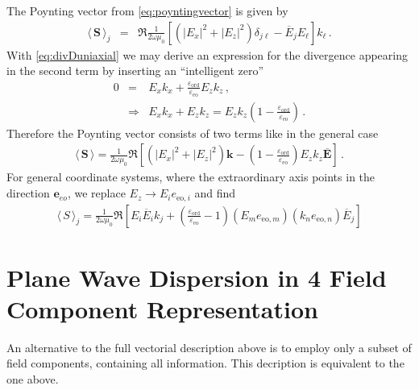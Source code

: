 \documentclass[12pt,a4paper,twoside,openright,BCOR10mm,headsepline,titlepage,abstracton,chapterprefix,final]{scrreprt}
\newcommand\Vector[1]{{\mathbf{#1}}}
\newcommand\vacuum{0}
\newcommand\wavenumber{k}
\newcommand\Wavevector{\Vector{\wavenumber}}
\newcommand\scalarEfield{E}
\newcommand\Efield{\Vector{\scalarEfield}}
\newcommand\vacuumpermeability{\scalarpermeability_{\vacuum}}
\newcommand\scalarpermeability{\mu}
\newcommand\scalarpermittivity{\varepsilon}
\newcommand\ordi{\text{ord}}
\newcommand\eo{\text{eo}}
\newcommand{\timeavg}[1]{{\langle\,#1\,\rangle}}
\begin{document}
The Poynting vector from \eqref{eq:poyntingvector} is given by
\begin{eqnarray}
 \timeavg{\Vector{S}}_j &=&  \Re\frac{1}{2 \omega \vacuumpermeability}\left[ (|\scalarEfield_x|^2 + |\scalarEfield_z|^2) \delta_{j\ell}  - \overline{\scalarEfield}_j \scalarEfield_\ell \right] k_\ell\,.
\end{eqnarray}
With \eqref{eq:divDuniaxial} we may derive an expression for the divergence appearing in the second term by inserting an ``intelligent zero''
\begin{eqnarray}
 0 &=& \scalarEfield_x \wavenumber_x + \frac{\scalarpermittivity_{\ordi}}{\scalarpermittivity_\eo} \scalarEfield_z \wavenumber_z\,,\nonumber\\
&\Rightarrow& \scalarEfield_x \wavenumber_x + \scalarEfield_z \wavenumber_z = \scalarEfield_z \wavenumber_z \left(1 - \frac{\scalarpermittivity_{\ordi}}{\scalarpermittivity_\eo}\right)\,. \label{eq:divEviolation}
\end{eqnarray}
Therefore the Poynting vector consists of two terms like in the general case
\begin{eqnarray}
  \timeavg{\Vector{S}} = \frac{ 1 }{ 2\omega\vacuumpermeability } \Re 
  \left[
      (|\scalarEfield_x|^2 + |\scalarEfield_z|^2)\Wavevector
      - \left(1 - \frac{\scalarpermittivity_{\ordi}}{\scalarpermittivity_\eo}\right)\scalarEfield_z \wavenumber_z \overline{\Efield}
  \right]\,.\label{eq:Suniaxialeo}
\end{eqnarray}
For general coordinate systems, where the extraordinary axis points in the direction $\Vector{e}_{eo}$, 
we replace $E_z \rightarrow E_i e_{\eo, i}$ and find
\begin{eqnarray}
  \timeavg{S}_j = \frac{ 1 }{ 2\omega\vacuumpermeability } \Re 
  \left[
      \scalarEfield_i \overline{\scalarEfield}_i \wavenumber_j
      + \left(\frac{\scalarpermittivity_{\ordi}}{\scalarpermittivity_\eo} - 1\right)
        (\scalarEfield_m e_{\eo,m}) (\wavenumber_n e_{\eo,n}) \overline{\scalarEfield}_j
  \right]
\end{eqnarray}

\section{Plane Wave Dispersion in 4 Field Component Representation}
An alternative to the full vectorial description above 
is to employ only a subset of field components,
containing all information.
This decription is equivalent to the one above.
\end{document}
